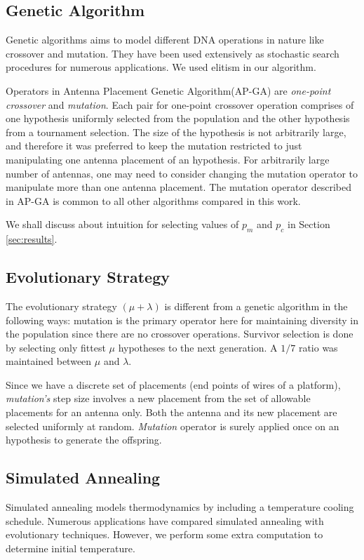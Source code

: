 \documentclass{sig-alternate}
\begin{document}
\subsection{Genetic Algorithm}
\label{sec:algorithms-ga}
Genetic algorithms aims to model different DNA operations in nature like crossover and mutation. They have been used extensively as stochastic search procedures for numerous applications. We used elitism in our algorithm.

Operators in Antenna Placement Genetic Algorithm(AP-GA) are \textit{one-point crossover} and \textit{mutation}. Each pair for one-point crossover operation comprises of one hypothesis uniformly selected from the population and the other hypothesis from a tournament selection. The size of the hypothesis is not arbitrarily large, and therefore it was preferred to keep the mutation restricted to just manipulating one antenna placement of an hypothesis. For arbitrarily large number of antennas, one may need to consider changing the mutation operator to manipulate more than one antenna placement. The mutation operator described in AP-GA is common to all other algorithms compared in this work. 

We shall discuss about intuition for selecting values of $p_m$ and $p_c$ in Section \ref{sec:results}. 

\subsection{Evolutionary Strategy}
\label{seThe placement space is finite as we shall elaborate further in Section c:algorithms-es}
The evolutionary strategy $(\mu + \lambda)$ is different from a genetic algorithm in the following ways: 
mutation is the primary operator here for maintaining diversity in the population since there are no crossover operations. Survivor selection is done by selecting only fittest $\mu$ hypotheses to the next generation. A $1/7$ ratio was maintained between $\mu$ and $\lambda$. 

Since we have a discrete set of placements (end points of wires of a platform), \textit{mutation's} step size involves a new placement from the set of allowable placements for an antenna only. Both the antenna and its new placement are selected uniformly at random. \textit{Mutation} operator is surely applied once on an hypothesis to generate the offspring.

\subsection{Simulated Annealing}
\label{sec:algoriths-sa}
Simulated annealing models thermodynamics by including a temperature cooling schedule. Numerous applications have compared simulated annealing with evolutionary techniques. However, we perform some extra computation to determine initial temperature.
\end{document}

